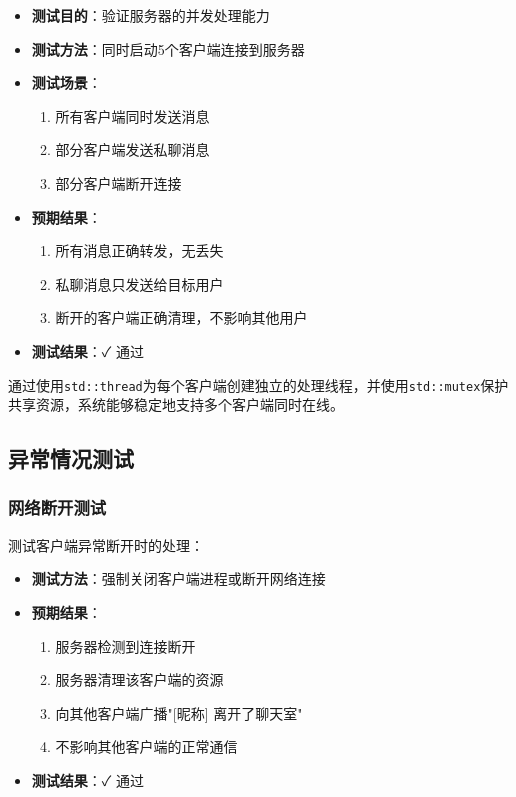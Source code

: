 \documentclass[12pt, a4paper]{article}
\newcommand{\cmd}[1]{\texttt{#1}}
\begin{document}
\begin{itemize}[itemsep=3pt]
  \item \textbf{测试目的}：验证服务器的并发处理能力
  \item \textbf{测试方法}：同时启动5个客户端连接到服务器
  \item \textbf{测试场景}：
  \begin{enumerate}[itemsep=2pt]
    \item 所有客户端同时发送消息
    \item 部分客户端发送私聊消息
    \item 部分客户端断开连接
  \end{enumerate}
  \item \textbf{预期结果}：
  \begin{enumerate}[itemsep=2pt]
    \item 所有消息正确转发，无丢失
    \item 私聊消息只发送给目标用户
    \item 断开的客户端正确清理，不影响其他用户
  \end{enumerate}
  \item \textbf{测试结果}：✓ 通过
\end{itemize}

通过使用\cmd{std::thread}为每个客户端创建独立的处理线程，并使用\cmd{std::mutex}保护共享资源，系统能够稳定地支持多个客户端同时在线。


\subsection{异常情况测试}

\subsubsection{网络断开测试}

测试客户端异常断开时的处理：

\begin{itemize}[itemsep=3pt]
  \item \textbf{测试方法}：强制关闭客户端进程或断开网络连接
  \item \textbf{预期结果}：
  \begin{enumerate}[itemsep=2pt]
    \item 服务器检测到连接断开
    \item 服务器清理该客户端的资源
    \item 向其他客户端广播"[昵称] 离开了聊天室"
    \item 不影响其他客户端的正常通信
  \end{enumerate}
  \item \textbf{测试结果}：✓ 通过
\end{itemize}
\end{document}
